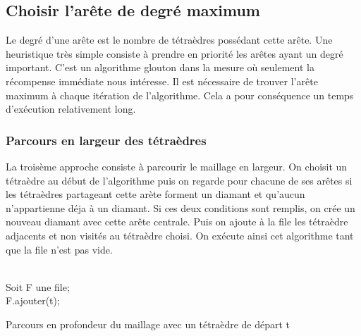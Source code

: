 \documentclass[a4paper,11pt,openany]{article}
\begin{document}
\begin{figure}[H]
\begin{center}
\end{center}
\end{figure}

\subsection{Choisir l'arête de degré maximum}
\noindent
Le degré d'une arête est le nombre de tétraèdres possédant cette arête. Une heuristique très simple consiste à prendre en priorité les arêtes ayant un degré important. C'est un algorithme glouton dans la mesure où seulement la récompense immédiate nous intéresse. Il est nécessaire de trouver l'arête maximum à chaque itération de l'algorithme. Cela a pour conséquence un temps d'exécution relativement long.
\subsubsection{Parcours en largeur des tétraèdres}
\label{parcours_largeur}
\noindent
La troisème approche consiste à parcourir le maillage en largeur. On choisit un tétraèdre au début de l'algorithme puis on regarde pour chacune de ses arêtes si les tétraèdres partageant cette arète forment un diamant et qu'aucun n'appartienne déja à un diamant. Si ces deux conditions sont remplis, on crée un nouveau diamant avec cette arête centrale. Puis on ajoute à la file les tétraèdre adjacents et non visités au tétraèdre choisi. On exécute ainsi cet algorithme tant que la file n'est pas vide.\\\\
\begin{algorithm}[H]
\SetAlgoLined	
 Soit F une file;\\
 F.ajouter(t);\\
 \caption{Parcours en profondeur du maillage avec un tétraèdre de départ t}
\end{algorithm}
\end{document}
